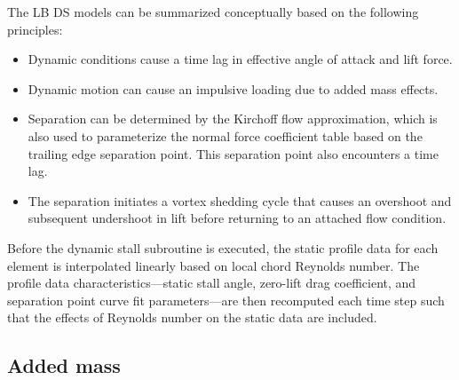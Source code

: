 The LB DS models can be summarized conceptually based on the following principles:
\begin{itemize}
    \item Dynamic conditions cause a time lag in effective angle of attack and
    lift force.
    
    \item Dynamic motion can cause an impulsive loading due to added mass
    effects.
    
    \item Separation can be determined by the Kirchoff flow approximation, which
    is also used to parameterize the normal force coefficient table based on the
    trailing edge separation point. This separation point also encounters a time
    lag.
    
    \item The separation initiates a vortex shedding cycle that causes an
    overshoot and subsequent undershoot in lift before returning to an attached
    flow condition.
\end{itemize}

Before the dynamic stall subroutine is executed, the static profile data for
each element is interpolated linearly based on local chord Reynolds number. The
profile data characteristics---static stall angle, zero-lift drag coefficient,
and separation point curve fit parameters---are then recomputed each time step
such that the effects of Reynolds number on the static data are included.



\subsection{Added mass}

